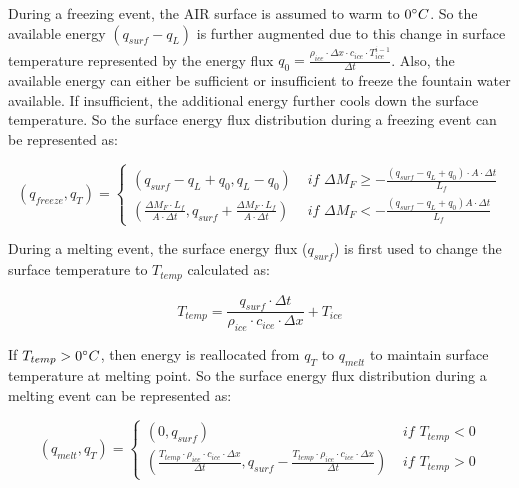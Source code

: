 \documentclass[utf8]{frontiersSCNS} %
\begin{document}
During a freezing event, the AIR surface is assumed to warm to $0 \degree C$. So the available energy $(q_{surf}-q_{L})$
is further augmented due to this change in surface temperature represented by the energy flux $q_{0} = \frac{\rho_{ice}
		\cdot \Delta x \cdot c_{ice} \cdot T_{ice}^{i-1}}{\Delta t}$. Also, the available energy can either be sufficient or
insufficient to freeze the fountain water available.  If insufficient, the additional energy further cools down the
surface temperature. So the surface energy flux distribution during a freezing event can be represented as:

\begin{equation}
	(q_{freeze}, q_{T}) = \left\{ \begin{array}{ll}
		(q_{surf}-q_{L}+q_{0}, q_{L}-q_{0}) & \textit{ if } \Delta M_{F} \geq -\frac{(q_{surf}-q_{L}+q_{0}) \cdot A \cdot \Delta
		t}{L_f}                                                                                                                  \\
		(\frac{\Delta M_{F} \cdot L_f
		}{A \cdot \Delta t}
		, q_{surf}+\frac{\Delta M_{F} \cdot L_f
		}{A \cdot \Delta t})                & \textit{ if } \Delta M_{F} < -\frac{(q_{surf}-q_{L}+q_0) A \cdot \Delta
		t}{L_f}
	\end{array} \right.
\end{equation}

During a melting event, the surface energy flux ($q_{surf}$) is first used to change the surface temperature to
$T_{temp}$ calculated as:

\begin{equation} T_{temp} =\frac{q_{surf} \cdot \Delta t}{\rho_{ice} \cdot c_{ice} \cdot \Delta x} + T_{ice} \end{equation}

If $T_{temp} > 0 \degree C$, then energy is reallocated from $q_{T}$ to $q_{melt}$ to maintain surface temperature at
melting point. So the surface energy flux distribution during a melting event can be represented as:

\begin{equation}
	(q_{melt}, q_{T}) = \left\{ \begin{array}{ll}
		(0, q_{surf})                                                                                                                                                 & \textit{ if } T_{temp} < 0 \\
		(\frac{T_{temp} \cdot \rho_{ice} \cdot c_{ice} \cdot \Delta x}{\Delta t}, q_{surf}-\frac{T_{temp} \cdot \rho_{ice} \cdot c_{ice} \cdot \Delta x}{\Delta t}  ) & \textit{ if } T_{temp} > 0
	\end{array} \right.
\end{equation}
\end{document}
